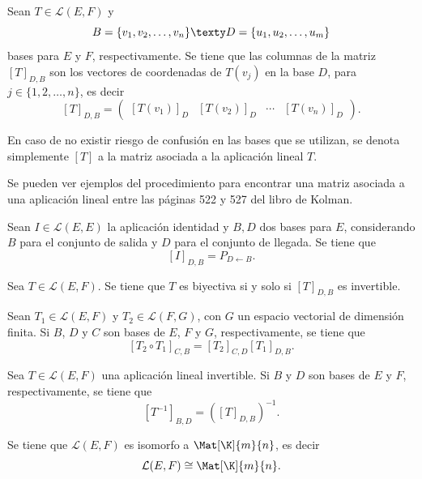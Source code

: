 \documentclass[a4,11pt]{aleph-notas}
\begin{document}
\begin{teo}
    Sean $T \in \mathcal{L}(E,F)$ y 
    \[
        B = \{v_1,v_2,\ldots,v_n\}
        \texty
        D = \{u_1,u_2,\ldots,u_m\}
    \]
    bases para $E$ y $F$, respectivamente. Se tiene que las columnas de la matriz $[T]_{D,B}$ son los vectores de coordenadas de $T(v_j)$ en la base $D$, para $j\in\{1,2,\ldots,n\}$, es decir
    \[
        [T]_{D,B} = \begin{pmatrix}
            [T(v_1)]_D & [T(v_2)]_D & \cdots & [T(v_n)]_D
        \end{pmatrix}.
    \]
\end{teo}

\begin{advertencia}
    En caso de no existir riesgo de confusión en las bases que se utilizan, se denota simplemente $[T]$ a la matriz asociada a la aplicación lineal $T$. 
\end{advertencia}


Se pueden ver ejemplos del procedimiento para encontrar una matriz asociada a una aplicación lineal entre las páginas 522 y 527 del libro de Kolman.


\begin{teo}
    Sean $I \in \mathcal{L}(E,E)$ la aplicación identidad y $B,D$ dos bases para $E$, considerando $B$ para el conjunto de salida y $D$ para el conjunto de llegada. Se tiene que
    \[
        [I]_{D,B} = P_{D\leftarrow B}.
    \]
\end{teo}



\begin{teo}
    Sea $T \in \mathcal{L}(E,F)$. Se tiene que $T$ es biyectiva si y solo si $[T]_{D,B}$ es invertible.
\end{teo}



\begin{teo}
    Sean $T_1 \in \mathcal{L}(E,F)$ y $T_2\in\mathcal{L}(F,G)$, con $G$ un espacio vectorial de dimensión finita. Si $B$, $D$ y $C$ son bases de $E$, $F$ y $G$, respectivamente, se tiene que
    \[
        [T_2\circ T_1]_{C,B} = [T_2]_{C,D}[T_1]_{D,B}.
    \]
\end{teo}


\begin{teo}
    Sea $T\in \mathcal{L}(E,F)$ una aplicación lineal invertible. Si $B$ y $D$ son bases de $E$ y $F$, respectivamente, se tiene que
    \[
        [T^{-1}]_{B,D} = \left([T]_{D,B}\right)^{-1}.
    \]
\end{teo}


\begin{teo}
    Se tiene que $\mathcal{L}(E,F)$ es isomorfo a $\Mat[\K]{m}{n}$, es decir
    \[
        \mathcal{L}(E,F)
        \cong
        \Mat[\K]{m}{n}.
    \]
\end{teo}
\end{document}
